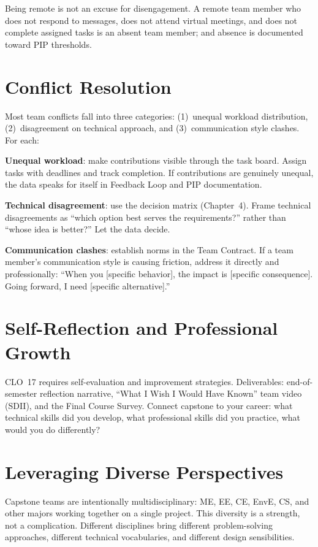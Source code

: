 Being remote is not an excuse for disengagement. A remote team member who does not respond to messages, does not attend virtual meetings, and does not complete assigned tasks is an absent team member; and absence is documented toward PIP thresholds.

\section{Conflict Resolution}
Most team conflicts fall into three categories: (1)~unequal workload distribution, (2)~disagreement on technical approach, and (3)~communication style clashes. For each:

\textbf{Unequal workload}: make contributions visible through the task board. Assign tasks with deadlines and track completion. If contributions are genuinely unequal, the data speaks for itself in Feedback Loop and PIP documentation.

\textbf{Technical disagreement}: use the decision matrix (Chapter~4). Frame technical disagreements as ``which option best serves the requirements?'' rather than ``whose idea is better?'' Let the data decide.

\textbf{Communication clashes}: establish norms in the Team Contract. If a team member's communication style is causing friction, address it directly and professionally: ``When you [specific behavior], the impact is [specific consequence]. Going forward, I need [specific alternative].''

\section{Self-Reflection and Professional Growth}
CLO~17 requires self-evaluation and improvement strategies. Deliverables: end-of-semester reflection narrative, ``What I Wish I Would Have Known'' team video (SDII), and the Final Course Survey. Connect capstone to your career: what technical skills did you develop, what professional skills did you practice, what would you do differently?


\section{Leveraging Diverse Perspectives}
Capstone teams are intentionally multidisciplinary: ME, EE, CE, EnvE, CS, and other majors working together on a single project. This diversity is a strength, not a complication. Different disciplines bring different problem-solving approaches, different technical vocabularies, and different design sensibilities.

